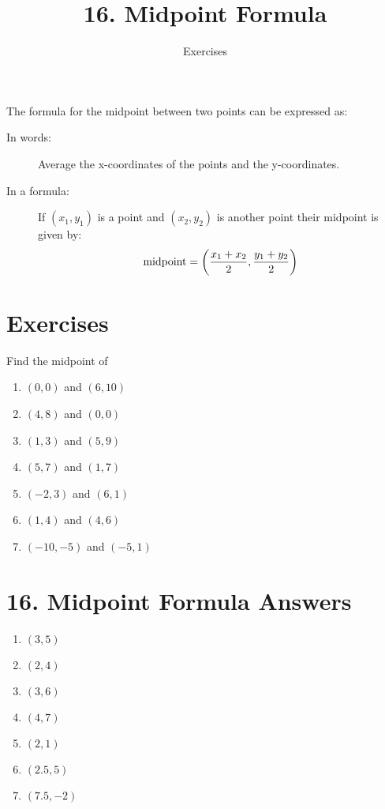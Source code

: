 \documentclass[11pt]{article}
\title{16. Midpoint Formula}
\author{Exercises}
\begin{document}
\maketitle
The formula for the midpoint between two points can be expressed as:
\begin{description}
	\item[In words:] Average the x-coordinates of the points and the y-coordinates.
	\item[In a formula:] If $(x_1, y_1)$ is a point and $(x_2, y_2)$ is another point
	their midpoint is given by:
	$$\hbox{midpoint}=\left(\frac{x_1+x_2}{2}, \frac{y_1+y_2}{2}\right)$$
\end{description}
\section*{Exercises}
Find the midpoint of
\begin{enumerate}
	\item $(0, 0)$ and $(6, 10)$
	\item $(4, 8)$ and $(0,0)$
	\item $(1, 3)$ and $(5, 9)$
	\item $(5, 7)$ and $(1, 7)$
	\item $(-2, 3)$ and $(6, 1)$
	\item $(1, 4)$ and $(4, 6)$
	\item $(-10, -5)$ and $(-5, 1)$
\end{enumerate}
\newpage
\section*{16. Midpoint Formula Answers}
\begin{enumerate}
	\item $(3, 5)$
	\item $(2, 4)$
	\item $(3, 6)$
	\item $(4, 7)$
	\item $(2, 1)$
	\item $(2.5, 5)$
	\item $(7.5, -2)$
\end{enumerate}
\end{document}
